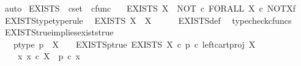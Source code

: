 \begin{isabellebody}
\ auto%
\endisatagproof
{\isafoldproof}%
%
\isadelimproof
%
\endisadelimproof
%
\isadelimdocument
%
\endisadelimdocument
%
\isatagdocument
%
\isamarkuptrue%
%
\endisatagdocument
{\isafolddocument}%
%
\isadelimdocument
%
\endisadelimdocument
{}\isamarkupfalse%
\ EXISTS\ {\isacharcolon}{\kern0pt}{\isacharcolon}{\kern0pt}\ {\isachardoublequoteopen}cset\ {\isasymRightarrow}\ cfunc{\isachardoublequoteclose}\ \isanewline
\ \ {\isachardoublequoteopen}EXISTS\ X\ {\isacharequal}{\kern0pt}\ NOT\ {\isasymcirc}\isactrlsub c\ FORALL\ X\ {\isasymcirc}\isactrlsub c\ NOT\isactrlbsup X\isactrlesup \isactrlsub f{\isachardoublequoteclose}\isanewline
\isanewline
{}\isamarkupfalse%
\ EXISTS{\isacharunderscore}{\kern0pt}type{\isacharbrackleft}{\kern0pt}type{\isacharunderscore}{\kern0pt}rule{\isacharbrackright}{\kern0pt}{\isacharcolon}{\kern0pt}\isanewline
\ \ {\isachardoublequoteopen}EXISTS\ X\ {\isacharcolon}{\kern0pt}\ {\isasymOmega}\isactrlbsup X\isactrlesup \ {\isasymrightarrow}\ {\isasymOmega}{\isachardoublequoteclose}\isanewline
%
\isadelimproof
\ \ %
\endisadelimproof
%
\isatagproof
{}\isamarkupfalse%
\ EXISTS{\isacharunderscore}{\kern0pt}def\ \isamarkupfalse%
\ typecheck{\isacharunderscore}{\kern0pt}cfuncs%
\endisatagproof
{\isafoldproof}%
%
\isadelimproof
\isanewline
%
\endisadelimproof
\isanewline
{}\isamarkupfalse%
\ EXISTS{\isacharunderscore}{\kern0pt}true{\isacharunderscore}{\kern0pt}implies{\isacharunderscore}{\kern0pt}exists{\isacharunderscore}{\kern0pt}true{\isacharcolon}{\kern0pt}\isanewline
\ \ \ p{\isacharunderscore}{\kern0pt}type{\isacharcolon}{\kern0pt}\ {\isachardoublequoteopen}p\ {\isacharcolon}{\kern0pt}\ X\ {\isasymrightarrow}\ {\isasymOmega}{\isachardoublequoteclose}\ \ EXISTS{\isacharunderscore}{\kern0pt}p{\isacharunderscore}{\kern0pt}true{\isacharcolon}{\kern0pt}\ {\isachardoublequoteopen}EXISTS\ X\ {\isasymcirc}\isactrlsub c\ {\isacharparenleft}{\kern0pt}p\ {\isasymcirc}\isactrlsub c\ left{\isacharunderscore}{\kern0pt}cart{\isacharunderscore}{\kern0pt}proj\ X\ {\isasymone}{\isacharparenright}{\kern0pt}\isactrlsup {\isasymsharp}\ {\isacharequal}{\kern0pt}\ {\isasymt}{\isachardoublequoteclose}\isanewline
\ \ \ {\isachardoublequoteopen}{\isasymexists}\ x{\isachardot}{\kern0pt}\ x\ {\isasymin}\isactrlsub c\ X\ {\isasymand}\ p\ {\isasymcirc}\isactrlsub c\ x\ {\isacharequal}{\kern0pt}\ {\isasymt}{\isachardoublequoteclose}\isanewline
%
\isadelimproof

\end{isabellebody}
